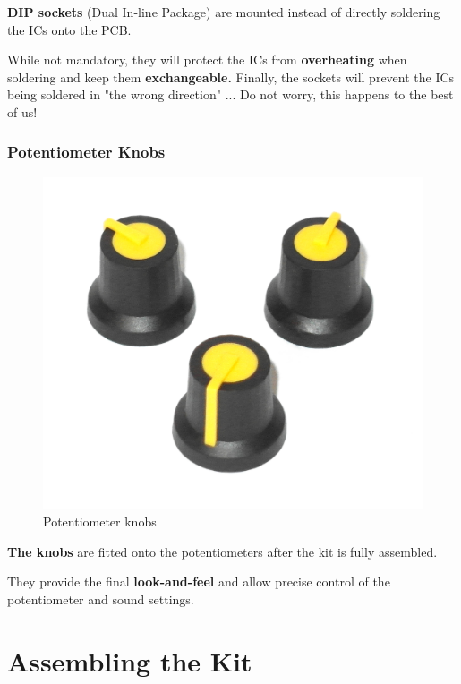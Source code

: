 \documentclass{scrartcl}
\begin{document}
\textbf{DIP sockets} (Dual In-line Package) are mounted instead of directly soldering the ICs onto the PCB.

While not mandatory, they will protect the ICs from \textbf{overheating} when soldering and keep them \textbf{exchangeable.} Finally, the sockets will prevent the ICs being soldered in "the wrong direction" ... Do not worry, this happens to the best of us!

\subsubsection{Potentiometer Knobs}

\begin{figure}[!ht]
    \begin{center}
        \includegraphics[scale=0.15]{assets/zekit-knobs.jpg}
        \caption{Potentiometer knobs}
    \end{center}
\end{figure}

\textbf{The knobs} are fitted onto the potentiometers after the kit is fully assembled.

They provide the final \textbf{look-and-feel} and allow precise control of the potentiometer and sound settings.

\pagebreak


\section{Assembling the Kit}
\end{document}
